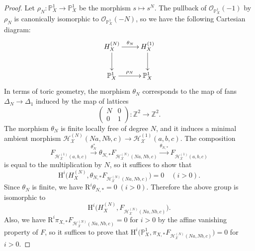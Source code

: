 \documentclass{amsart}
\theoremstyle{plain}
\theoremstyle{definition}
\theoremstyle{remark}
\numberwithin{equation}{section}
\begin{document}
\begin{proof}
    Let $\rho_{N}\colon \mathbb{P}^1_X\to \mathbb{P}^1_X$ be the morphism $s\mapsto s^N$.
    The pullback of $\mathcal{O}_{\mathbb{P}^1_X}(-1)$ by $\rho_N$ is canonically isomorphic to $\mathcal{O}_{\mathbb{P}^1_X}(-N)$, so we have the following Cartesian diagram:
    $$
    \xymatrix{
        H^{(N)}_X\ar[r]^-{\theta_N}\ar[d]		&H^{(1)}_X\ar[d]\\
        \mathbb{P}^1_X\ar[r]^-{\rho_N}				&\mathbb{P}^1_X
    }
    $$
    In terms of toric geometry, the morphism $\theta_N$ corresponds to the map of fans $\Delta_N\to \Delta_1$ induced by the map of lattices
        $$
            \begin{pmatrix}N&0\\0&1\end{pmatrix}\colon \mathbb{Z}^2\to \mathbb{Z}^2.
        $$
    The morphism $\theta_N$ is finite locally free of degree $N$, and it induces a minimal ambient morphism $\mathcal{H}_\mathcal{X}^{(N)}(Na,Nb,c)\to \mathcal{H}_\mathcal{X}^{(1)}(a,b,c)$.
    The composition
    $$
        F_{\mathcal{H}^{(1)}_\mathcal{X}(a,b,c)}\xrightarrow{\theta_N^*} \theta_{N,*} F_{\mathcal{H}^{(N)}_\mathcal{X}(Na,Nb,c)}\xrightarrow{\theta_{N,*}} F_{\mathcal{H}^{(1)}_\mathcal{X}(a,b,c)}
    $$
    is equal to the multiplication by $N$, so it suffices to show that 
    $$
        \mathrm{H}^i\bigl(H^{(N)}_X, \theta_{N,*}F_{\mathcal{H}^{(N)}_\mathcal{X}(Na,Nb,c)}\bigr)=0\quad (i>0).
    $$
    Since $\theta_N$ is finite, we have $\mathrm{R}^i\theta_{N,*}=0\;(i>0)$.
    Therefore the above group is isomorphic to
    $$
        \mathrm{H}^i\bigl(H^{(N)}_X, F_{\mathcal{H}^{(N)}_\mathcal{X}(Na,Nb,c)}\bigr).
    $$
    Also, we have $\mathrm{R}^i\pi_{X,*}F_{\mathcal{H}^{(N)}_\mathcal{X}(Na,Nb,c)}=0$ for $i>0$ by the affine vanishing property of $F$, so it suffices to prove that $\mathrm{H}^i\bigl(\mathbb{P}^1_X, \pi_{X,*}F_{\mathcal{H}_\mathcal{X}^{(N)}(Na,Nb,c)}\bigr)=0$ for $i>0$.
        

\end{proof}
\end{document}
